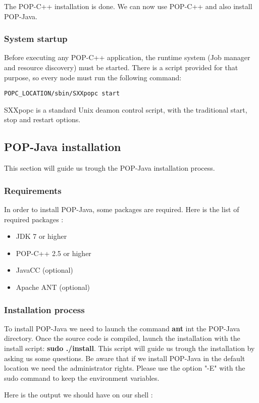 The POP-C++ installation is done. We can now use POP-C++ and also install POP-Java.

\subsubsection{System startup}
Before executing any POP-C++ application, the runtime system (Job manager and resource discovery) must be started. There is a script provided for that purpose, so every node must run the following command: 
\begin{lstlisting}
POPC_LOCATION/sbin/SXXpopc start
\end{lstlisting}\s

SXXpopc is a standard Unix deamon control script, with the traditional start, stop and restart options.


\pagebreak
\subsection{POP-Java installation}
This section will guide us trough the POP-Java installation process.

\subsubsection{Requirements}
In order to install POP-Java, some packages are required. Here is the list of required packages : 
\begin{itemize}
\item JDK 7 or higher
\item POP-C++ 2.5 or higher
\item JavaCC (optional)
\item Apache ANT (optional)
\end{itemize}

\subsubsection{Installation process}
To install POP-Java we need to launch the command \textbf{ant} int the POP-Java directory. Once the source code is compiled,
launch the installation with the install script: \textbf{sudo ./install}.
This script will guide us trough the installation by asking us some questions.
Be aware that if we install POP-Java in the default location we need the administrator rights.
Please use the option "-E" with the sudo command to keep the environment variables.\s

Here is the output we should have on our shell : \s

